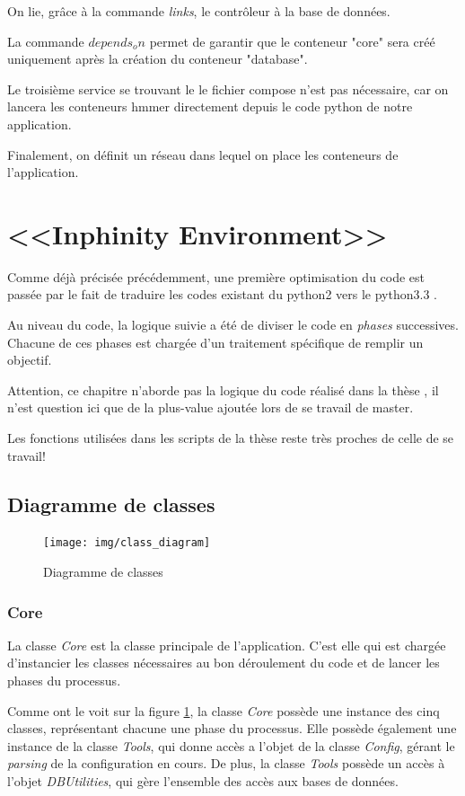On lie, grâce à la commande \emph{links}, le contrôleur à la base de données.

La commande \emph{$depends_on$} permet de garantir que le conteneur "core" sera créé uniquement après la création du conteneur "database".

Le troisième service se trouvant le le fichier compose n'est pas nécessaire, car on lancera les conteneurs hmmer directement depuis le code python de notre application. 

Finalement, on définit un réseau dans lequel on place les conteneurs de l'application.

\section{<<Inphinity Environment>>}

Comme déjà précisée précédemment, une première optimisation du code est passée par le fait de traduire les codes existant du python2 vers le python3.3 .

Au niveau du code, la logique suivie a été de diviser le code en \emph{phases} successives. Chacune de ces phases est chargée d'un traitement spécifique de remplir un objectif.

Attention, ce chapitre n'aborde pas la logique du code réalisé dans la thèse \thLeite , il n'est question ici que de la plus-value ajoutée lors de se travail de master.

Les fonctions utilisées dans les scripts de la thèse \thLeite reste très proches de celle de se travail!

\subsection{Diagramme de classes}
\begin{figure}[H] 
\centering 
\texttt{[image: img/class\_diagram]} 
\caption[classdiagram]{Diagramme de classes}
\label{fig:classdiagram} 
\end{figure}

\subsubsection{Core}
La classe \emph{Core} est la classe principale de l'application. C'est elle qui est chargée d'instancier les classes nécessaires au bon déroulement du code et de lancer les phases du processus.

Comme ont le voit sur la figure \ref{fig:classdiagram}, la classe \emph{Core} possède une instance des cinq classes, représentant chacune une phase du processus. Elle possède également une instance de la classe \emph{Tools}, qui donne accès a l'objet de la classe \emph{Config}, gérant le \emph{parsing} de la configuration en cours. De plus, la classe \emph{Tools} possède un accès à l'objet \emph{DBUtilities}, qui gère l'ensemble des accès aux bases de données.

